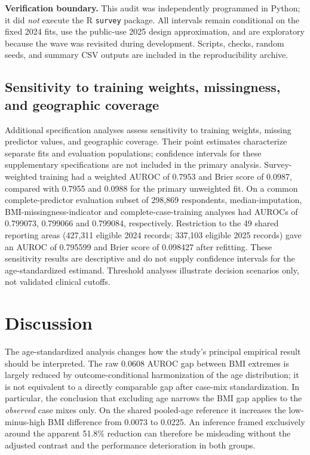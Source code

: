\textbf{Verification boundary.} This audit was independently programmed in Python; it did \emph{not} execute the R \texttt{survey} package. All intervals remain conditional on the fixed 2024 fits, use the public-use 2025 design approximation, and are exploratory because the wave was revisited during development. Scripts, checks, random seeds, and summary CSV outputs are included in the reproducibility archive.

\subsection{Sensitivity to training weights, missingness, and geographic coverage}
Additional specification analyses assess sensitivity to training weights, missing predictor values, and geographic coverage. Their point estimates characterize separate fits and evaluation populations; confidence intervals for these supplementary specifications are not included in the primary analysis. Survey-weighted training had a weighted AUROC of 0.7953 and Brier score of 0.0987, compared with 0.7955 and 0.0988 for the primary unweighted fit. On a common complete-predictor evaluation subset of 298,869 respondents, median-imputation, BMI-missingness-indicator and complete-case-training analyses had AUROCs of 0.799073, 0.799066 and 0.799084, respectively. Restriction to the 49 shared reporting areas (427,311 eligible 2024 records; 337,103 eligible 2025 records) gave an AUROC of 0.795599 and Brier score of 0.098427 after refitting. These sensitivity results are descriptive and do not supply confidence intervals for the age-standardized estimand. Threshold analyses illustrate decision scenarios only, not validated clinical cutoffs.

\section{Discussion}
The age-standardized analysis changes how the study's principal empirical result should be interpreted. The raw 0.0608 AUROC gap between BMI extremes is largely reduced by outcome-conditional harmonization of the age distribution; it is not equivalent to a directly comparable gap after case-mix standardization. In particular, the conclusion that excluding age narrows the BMI gap applies to the \emph{observed} case mixes only. On the shared pooled-age reference it increases the low-minus-high BMI difference from 0.0073 to 0.0225. An inference framed exclusively around the apparent 51.8\% reduction can therefore be misleading without the adjusted contrast and the performance deterioration in both groups.

